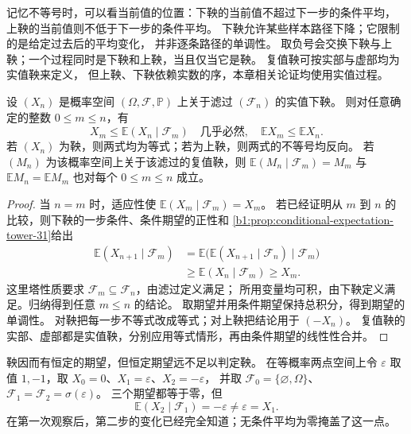 记忆不等号时，可以看当前值的位置：下鞅的当前值不超过下一步的条件平均，
上鞅的当前值则不低于下一步的条件平均。
下鞅允许某些样本路径下降；它限制的是给定过去后的平均变化，
并非逐条路径的单调性。
取负号会交换下鞅与上鞅；一个过程同时是下鞅和上鞅，当且仅当它是鞅。
复值鞅可按实部与虚部均为实值鞅来定义，
但上鞅、下鞅依赖实数的序，本章相关论证均使用实值过程。

\begin{proposition}[从一步比较到任意确定时刻]
\label{b1:prop:martingale-multistep-31}
设 \((X_n)\) 是概率空间 \((\Omega,\mathcal F,\mathbb P)\)
上关于滤过 \((\mathcal F_n)\) 的实值下鞅。
则对任意确定的整数 \(0\leq m\leq n\)，有
\[
 X_m\leq\mathbb E(X_n\mid\mathcal F_m)
 \quad\text{几乎必然},
 \quad
 \mathbb E X_m\leq\mathbb E X_n.
\]
若 \((X_n)\) 为鞅，则两式均为等式；若为上鞅，则两式的不等号均反向。
若 \((M_n)\) 为该概率空间上关于该滤过的复值鞅，则
\(\mathbb E(M_n\mid\mathcal F_m)=M_m\) 与 \(\mathbb E M_n=\mathbb E M_m\)
也对每个 \(0\leq m\leq n\) 成立。
\end{proposition}
\begin{proof}
当 \(n=m\) 时，适应性使 \(\mathbb E(X_m\mid\mathcal F_m)=X_m\)。
若已经证明从 \(m\) 到 \(n\) 的比较，则下鞅的一步条件、条件期望的正性和%
\cref{b1:prop:conditional-expectation-tower-31}给出
\[
 \begin{aligned}
 \mathbb E(X_{n+1}\mid\mathcal F_m)
 &=\mathbb E\bigl(\mathbb E(X_{n+1}\mid\mathcal F_n)
                        \mid\mathcal F_m\bigr)\\
 &\geq\mathbb E(X_n\mid\mathcal F_m)\geq X_m.
 \end{aligned}
\]
这里塔性质要求 \(\mathcal F_m\subseteq\mathcal F_n\)，由滤过定义满足；
所用变量均可积，由下鞅定义满足。归纳得到任意 \(m\leq n\) 的结论。
取期望并用条件期望保持总积分，得到期望的单调性。
对鞅把每一步不等式改成等式；对上鞅把结论用于 \((-X_n)\)。
复值鞅的实部、虚部都是实值鞅，分别应用等式情形，再由条件期望的线性性合并。
\end{proof}

鞅因而有恒定的期望，但恒定期望远不足以判定鞅。
在等概率两点空间上令 \(\varepsilon\) 取值 \(1,-1\)，取
\(X_0=0\)、\(X_1=\varepsilon\)、\(X_2=-\varepsilon\)，
并取 \(\mathcal F_0=\{\varnothing,\Omega\}\)、
\(\mathcal F_1=\mathcal F_2=\sigma(\varepsilon)\)。
三个期望都等于零，但
\[
 \mathbb E(X_2\mid\mathcal F_1)=-\varepsilon\ne\varepsilon=X_1.
\]
在第一次观察后，第二步的变化已经完全知道；无条件平均为零掩盖了这一点。

